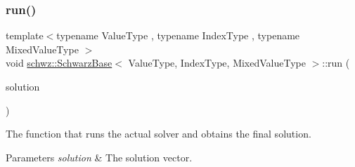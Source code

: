 \subsubsection{\texorpdfstring{run()}{run()}}
{\footnotesize\ttfamily template$<$typename Value\+Type , typename Index\+Type , typename Mixed\+Value\+Type $>$ \\
void \hyperlink{classschwz_1_1SchwarzBase}{schwz\+::\+Schwarz\+Base}$<$ Value\+Type, Index\+Type, Mixed\+Value\+Type $>$\+::run (\begin{DoxyParamCaption}\item[{std\+::shared\+\_\+ptr$<$ gko\+::matrix\+::\+Dense$<$ Value\+Type $>$$>$ \&}]{solution }\end{DoxyParamCaption})}



The function that runs the actual solver and obtains the final solution. 


\begin{DoxyParams}{Parameters}
{\em solution} & The solution vector. \\
\hline
\end{DoxyParams}


